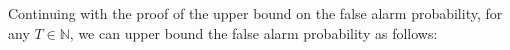 \documentclass[12pt]{interact}
\newcommand{\lp}{\left(}
\newcommand{\rp}{\right)}
\newcommand{\lb}{\left[}
\newcommand{\rb}{\right]}
\newcommand{\mrm}{\mathrm}
\newcommand{\mbb}{\mathbb}
\renewcommand{\Pr}{\mathbb{P}}
\theoremstyle{plain}
\begin{document}
Continuing with the proof of the upper bound on the false alarm probability, for any $T\in\mbb{N}$, we can upper bound the false alarm probability as follows:
%
\end{document}
